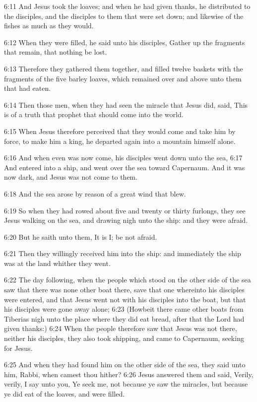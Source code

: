 6:11 And Jesus took the loaves; and when he had given thanks, he
distributed to the disciples, and the disciples to them that were set
down; and likewise of the fishes as much as they would.

6:12 When they were filled, he said unto his disciples, Gather up the
fragments that remain, that nothing be lost.

6:13 Therefore they gathered them together, and filled twelve baskets
with the fragments of the five barley loaves, which remained over and
above unto them that had eaten.

6:14 Then those men, when they had seen the miracle that Jesus did,
said, This is of a truth that prophet that should come into the world.

6:15 When Jesus therefore perceived that they would come and take him
by force, to make him a king, he departed again into a mountain
himself alone.

6:16 And when even was now come, his disciples went down unto the sea,
6:17 And entered into a ship, and went over the sea toward Capernaum.
And it was now dark, and Jesus was not come to them.

6:18 And the sea arose by reason of a great wind that blew.

6:19 So when they had rowed about five and twenty or thirty furlongs,
they see Jesus walking on the sea, and drawing nigh unto the ship: and
they were afraid.

6:20 But he saith unto them, It is I; be not afraid.

6:21 Then they willingly received him into the ship: and immediately
the ship was at the land whither they went.

6:22 The day following, when the people which stood on the other side
of the sea saw that there was none other boat there, save that one
whereinto his disciples were entered, and that Jesus went not with his
disciples into the boat, but that his disciples were gone away alone;
6:23 (Howbeit there came other boats from Tiberias nigh unto the place
where they did eat bread, after that the Lord had given thanks:) 6:24
When the people therefore saw that Jesus was not there, neither his
disciples, they also took shipping, and came to Capernaum, seeking for
Jesus.

6:25 And when they had found him on the other side of the sea, they
said unto him, Rabbi, when camest thou hither?  6:26 Jesus answered
them and said, Verily, verily, I say unto you, Ye seek me, not because
ye saw the miracles, but because ye did eat of the loaves, and were
filled.

